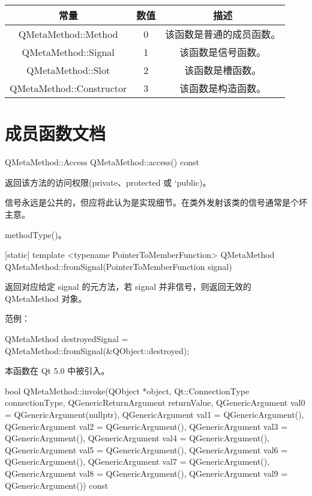 \begin{tabular}{|c|c|c|}
	\hline
	常量  &	数值 	& 描述  \\ 
	\hline
	QMetaMethod::Method &	0 &	该函数是普通的成员函数。 \\
	\hline
	QMetaMethod::Signal &	1 	&该函数是信号函数。 \\
	\hline
	QMetaMethod::Slot &	2 &	该函数是槽函数。 \\ 
	\hline
	QMetaMethod::Constructor &	3 &	该函数是构造函数。 \\ 
	\hline
	\end{tabular}

\section{成员函数文档}

QMetaMethod::Access QMetaMethod::access() const

返回该方法的访问权限(private、protected 或 `public)。

\begin{notice}
信号永远是公共的，但应将此认为是实现细节。在类外发射该类的信号通常是个坏主意。
\end{notice}

\begin{seeAlso}
methodType()。
\end{seeAlso}

[static] template <typename PointerToMemberFunction> QMetaMethod QMetaMethod::fromSignal(PointerToMemberFunction signal)

返回对应给定 signal 的元方法，若 signal 并非信号，则返回无效的 QMetaMethod 对象。

范例：

\begin{cppcode}
QMetaMethod destroyedSignal = QMetaMethod::fromSignal(&QObject::destroyed);
\end{cppcode}


本函数在 Qt 5.0 中被引入。

bool QMetaMethod::invoke(QObject *object, Qt::ConnectionType connectionType, QGenericReturnArgument returnValue, 
   QGenericArgument val0 = QGenericArgument(nullptr), 
   QGenericArgument val1 = QGenericArgument(), 
QGenericArgument val2 = QGenericArgument(), 
QGenericArgument val3 = QGenericArgument(), 
QGenericArgument val4 = QGenericArgument(), 
QGenericArgument val5 = QGenericArgument(), 
QGenericArgument val6 = QGenericArgument(), 
QGenericArgument val7 = QGenericArgument(),
 QGenericArgument val8 = QGenericArgument(), 
 QGenericArgument val9 = QGenericArgument()) const

